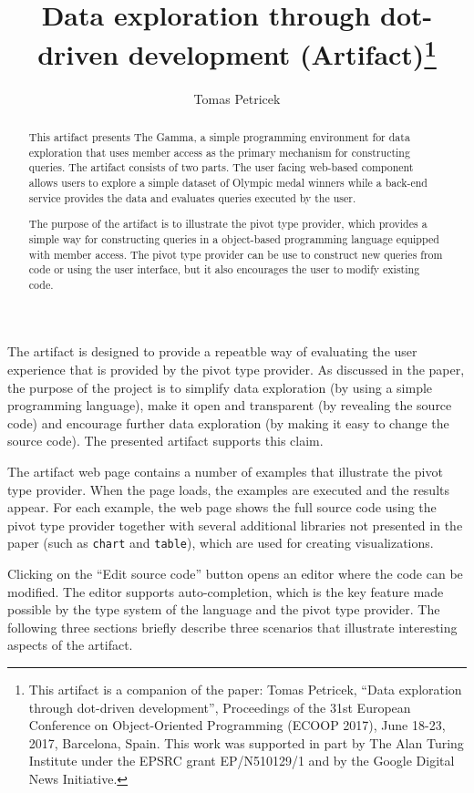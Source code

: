 \documentclass[a4paper,UKenglish]{darts}
\title{Data exploration through dot-driven development (Artifact)\footnote{This artifact is a companion of the paper:  Tomas Petricek, ``Data exploration through dot-driven development'', Proceedings of the 31st European Conference on Object-Oriented Programming (ECOOP 2017), June 18-23, 2017, Barcelona, Spain.  This work was supported in part by The Alan Turing Institute under the EPSRC grant EP/N510129/1 and by the Google Digital News Initiative.}}
\author[1]{Tomas Petricek}
\affil[1]{The Alan Turing Institute, London, UK\\
 and Microsoft Research, Cambridge, UK\\
  \texttt{tomas@tomasp.net}}
\begin{document}
\maketitle

\begin{abstract}
This artifact presents The Gamma, a simple programming environment for data exploration
that uses member access as the primary mechanism for constructing queries. The artifact 
consists of two parts. The user facing web-based component allows users to explore a simple
dataset of Olympic medal winners while a back-end service provides the data and evaluates
queries executed by the user.

The purpose of the artifact is to illustrate the pivot type provider, which provides a simple
way for constructing queries in a object-based programming language equipped with member 
access. The pivot type provider can be use to
construct new queries from code or using the user interface, but it also encourages the user
to modify existing code.  
\end{abstract}

\begin{scope}
The artifact is designed to provide a repeatble way of evaluating the user experience that
is provided by the pivot type provider. As discussed in the paper, the purpose of the project
is to simplify data exploration (by using a simple programming language), make it open and 
transparent (by revealing the source code) and encourage further data exploration (by making
it easy to change the source code). The presented artifact supports this claim.
  
The artifact web page contains a number of examples that illustrate the pivot type provider. When the
page loads, the examples are executed and the results appear.
For each example, the web page shows the full source code using the pivot type provider together
with several additional libraries not presented in the paper (such as \texttt{chart} and \texttt{table}),
which are used for creating visualizations.

Clicking on the ``Edit source code'' button opens an editor where the code can be modified. The
editor supports auto-completion, which is the key feature made possible by the type system of the
language and the pivot type provider. The following three sections briefly describe three scenarios
that illustrate interesting aspects of the artifact.
\end{scope}
\end{document}
